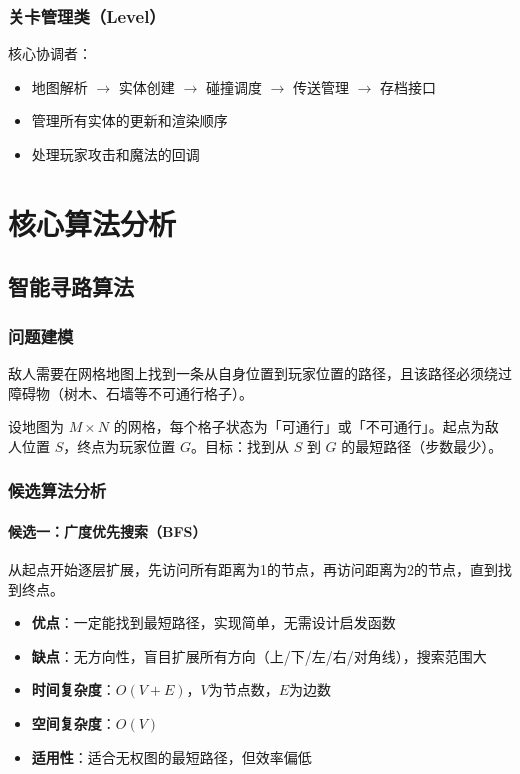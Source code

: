 \documentclass[12pt,a4paper]{article}
\begin{document}
\subsubsection{关卡管理类（Level）}

核心协调者：
\begin{itemize}[leftmargin=2em]
    \item 地图解析 $\rightarrow$ 实体创建 $\rightarrow$ 碰撞调度 $\rightarrow$ 传送管理 $\rightarrow$ 存档接口
    \item 管理所有实体的更新和渲染顺序
    \item 处理玩家攻击和魔法的回调
\end{itemize}


\section{核心算法分析}

\subsection{智能寻路算法}

\subsubsection{问题建模}

敌人需要在网格地图上找到一条从自身位置到玩家位置的路径，且该路径必须绕过障碍物（树木、石墙等不可通行格子）。

设地图为 $M \times N$ 的网格，每个格子状态为「可通行」或「不可通行」。起点为敌人位置 $S$，终点为玩家位置 $G$。目标：找到从 $S$ 到 $G$ 的最短路径（步数最少）。

\subsubsection{候选算法分析}

\paragraph{候选一：广度优先搜索（BFS）}

从起点开始逐层扩展，先访问所有距离为1的节点，再访问距离为2的节点，直到找到终点。

\begin{itemize}[leftmargin=2em]
    \item \textbf{优点}：一定能找到最短路径，实现简单，无需设计启发函数
    \item \textbf{缺点}：无方向性，盲目扩展所有方向（上/下/左/右/对角线），搜索范围大
    \item \textbf{时间复杂度}：$O(V + E)$，$V$为节点数，$E$为边数
    \item \textbf{空间复杂度}：$O(V)$
    \item \textbf{适用性}：适合无权图的最短路径，但效率偏低
\end{itemize}
\end{document}

